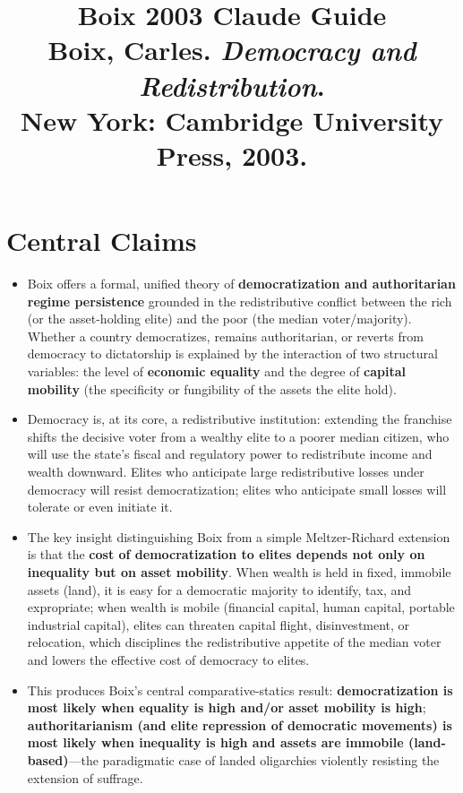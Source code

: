 \documentclass[12pt]{article}
\title{\textbf{Boix 2003 Claude Guide}\\
\large Boix, Carles. \textit{Democracy and Redistribution}.\\
New York: Cambridge University Press, 2003.}
\author{}
\date{}
\begin{document}
\maketitle
\tableofcontents
\newpage

\section{Central Claims}

\begin{itemize}[leftmargin=*, itemsep=4pt]
    \item Boix offers a formal, unified theory of \textbf{democratization and authoritarian regime persistence} grounded in the redistributive conflict between the rich (or the asset-holding elite) and the poor (the median voter/majority). Whether a country democratizes, remains authoritarian, or reverts from democracy to dictatorship is explained by the interaction of two structural variables: the level of \textbf{economic equality} and the degree of \textbf{capital mobility} (the specificity or fungibility of the assets the elite hold).
    \item Democracy is, at its core, a redistributive institution: extending the franchise shifts the decisive voter from a wealthy elite to a poorer median citizen, who will use the state's fiscal and regulatory power to redistribute income and wealth downward. Elites who anticipate large redistributive losses under democracy will resist democratization; elites who anticipate small losses will tolerate or even initiate it.
    \item The key insight distinguishing Boix from a simple Meltzer-Richard extension is that the \textbf{cost of democratization to elites depends not only on inequality but on asset mobility}. When wealth is held in fixed, immobile assets (land), it is easy for a democratic majority to identify, tax, and expropriate; when wealth is mobile (financial capital, human capital, portable industrial capital), elites can threaten capital flight, disinvestment, or relocation, which disciplines the redistributive appetite of the median voter and lowers the effective cost of democracy to elites.
    \item This produces Boix's central comparative-statics result: \textbf{democratization is most likely when equality is high and/or asset mobility is high}; \textbf{authoritarianism (and elite repression of democratic movements) is most likely when inequality is high and assets are immobile (land-based)}---the paradigmatic case of landed oligarchies violently resisting the extension of suffrage.

\end{itemize}
\end{document}
